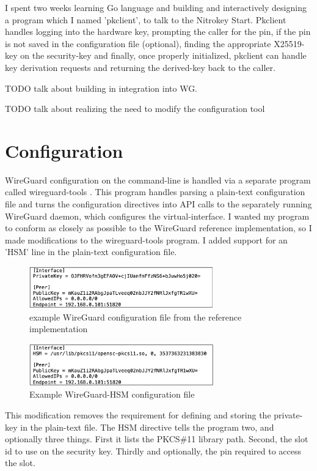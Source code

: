 \documentclass [11pt, proquest] {uwthesis}[2020/02/24]
\begin{document}
I spent two weeks learning Go language and building and interactively designing a program which I named 'pkclient', to talk to the Nitrokey Start. Pkclient handles logging into the hardware key, prompting the caller for the pin, if the pin is not saved in the configuration file (optional), finding the appropriate X25519-key on the security-key and finally, once properly initialized, pkclient can handle key derivation requests and returning the derived-key back to the caller.

TODO talk about building in integration into WG.

TODO talk about realizing the need to modify the configuration tool

\section{Configuration}
WireGuard configuration on the command-line is handled via a separate program called wireguard-tools \cite{noauthor_wireguard-tools_2022}. This program handles parsing a plain-text configuration file and turns the configuration directives into API calls to the separately running WireGuard daemon, which configures the virtual-interface. I wanted my program to conform as closely as possible to the WireGuard reference implementation, so I made modifications to the wireguard-tools program. I added support for an 'HSM' line in the plain-text configuration file. 
\begin{figure}[ht]
\includegraphics[width=8cm]{paper/images/wg_conf_std.png}
\caption{example WireGuard configuration file from the reference implementation}
\label{fig:wg_config}
\end{figure}

\begin{figure}[ht]
\includegraphics[width=8cm]{paper/images/wg_conf_hsm.png}
\caption{Example WireGuard-HSM configuration file}
\label{fig:hsm_config}
\end{figure}
This modification removes the requirement for defining and storing the private-key in the plain-text file. The HSM directive tells the program two, and optionally three things. First it lists the PKCS\#11 library path. Second, the slot id  to use on the security key. Thirdly and optionally, the pin required to access the slot.
\end{document}
